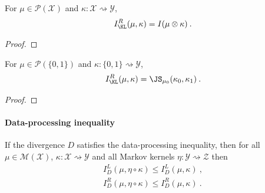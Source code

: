 \begin{lemma}
  \label{lem:mutualInfoRight_eq_mutualInfo}
  For $\mu \in \mathcal P(\mathcal X)$ and $\kappa : \mathcal X \rightsquigarrow \mathcal Y$,
  \begin{align*}
  I_{\KL}^R(\mu, \kappa) = I(\mu \otimes \kappa) \: .
  \end{align*}
\end{lemma}

\begin{proof}%
\uses{}

\end{proof}


\begin{corollary}
  \label{cor:mutualInfoRight_eq_jensenShannon}
  For $\mu \in \mathcal P(\{0,1\})$ and $\kappa : \{0,1\} \rightsquigarrow \mathcal Y$,
  \begin{align*}
  I_{\KL}^R(\mu, \kappa) = \JS_{\mu_0}(\kappa_0, \kappa_1) \: .
  \end{align*}
\end{corollary}

\begin{proof}%
{}

\end{proof}



\paragraph{Data-processing inequality}


\begin{theorem}
  \label{thm:mutualInfoLeft_comp_le}
  If the divergence $D$ satisfies the data-processing inequality, then for all $\mu \in \mathcal M(\mathcal X)$, $\kappa : \mathcal X \rightsquigarrow \mathcal Y$ and all Markov kernels $\eta : \mathcal Y \rightsquigarrow \mathcal Z$ then
  \begin{align*}
  I_D^L(\mu, \eta \circ \kappa) \le I_D^L(\mu, \kappa)
  \: , \\
  I_D^R(\mu, \eta \circ \kappa) \le I_D^R(\mu, \kappa)
  \: .
  \end{align*}
  
\end{theorem}


